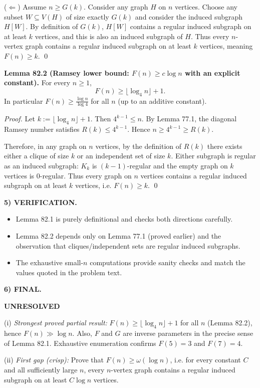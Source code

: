 ($\Leftarrow$) Assume $n\ge G(k)$. Consider any graph $H$ on $n$ vertices. Choose any subset $W\subseteq V(H)$ of size exactly $G(k)$ and consider the induced subgraph $H[W]$.
By definition of $G(k)$, $H[W]$ contains a regular induced subgraph on at least $k$ vertices, and this is also an induced subgraph of $H$. Thus every $n$-vertex graph contains a regular induced subgraph on at least $k$ vertices, meaning $F(n)\ge k$.
\qed

\medskip
\noindent\textbf{Lemma 82.2 (Ramsey lower bound: $F(n)\ge c\log n$ with an explicit constant).}
For every $n\ge 1$,
\[
F(n)\ge \bigl\lfloor \log_4 n\bigr\rfloor+1.
\]
In particular $F(n)\ge \frac{\log n}{\log 4}$ for all $n$ (up to an additive constant).

\emph{Proof.}
Let $k:=\lfloor \log_4 n\rfloor+1$. Then $4^{k-1}\le n$.
By Lemma 77.1, the diagonal Ramsey number satisfies $R(k)\le 4^{k-1}$. Hence $n\ge 4^{k-1}\ge R(k)$.

Therefore, in any graph on $n$ vertices, by the definition of $R(k)$ there exists either a clique of size $k$ or an independent set of size $k$.
Either subgraph is regular as an induced subgraph: $K_k$ is $(k-1)$-regular and the empty graph on $k$ vertices is $0$-regular.
Thus every graph on $n$ vertices contains a regular induced subgraph on at least $k$ vertices, i.e. $F(n)\ge k$. \qed

\medskip
\noindent\textbf{5) VERIFICATION.}

\begin{itemize}
\item Lemma 82.1 is purely definitional and checks both directions carefully.
\item Lemma 82.2 depends only on Lemma 77.1 (proved earlier) and the observation that cliques/independent sets are regular induced subgraphs.
\item The exhaustive small-$n$ computations provide sanity checks and match the values quoted in the problem text.
\end{itemize}

\medskip
\noindent\textbf{6) FINAL.}

\textbf{UNRESOLVED}

(i) \emph{Strongest proved partial result:} $F(n)\ge \lfloor \log_4 n\rfloor+1$ for all $n$ (Lemma 82.2), hence $F(n)\gg \log n$. Also, $F$ and $G$ are inverse parameters in the precise sense of Lemma 82.1. Exhaustive enumeration confirms $F(5)=3$ and $F(7)=4$.

(ii) \emph{First gap (crisp):} Prove that $F(n)\ge \omega(\log n)$, i.e. for every constant $C$ and all sufficiently large $n$, every $n$-vertex graph contains a regular induced subgraph on at least $C\log n$ vertices.

